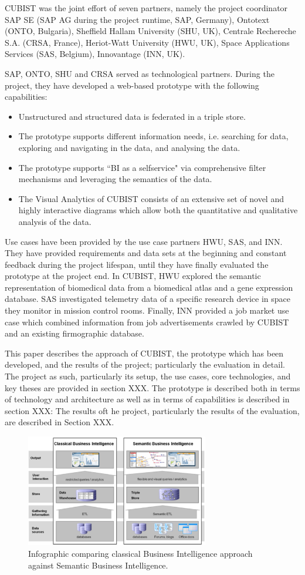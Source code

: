CUBIST was the joint effort of seven partners, namely the project coordinator SAP SE (SAP AG during the project runtime, SAP, Germany), Ontotext (ONTO, Bulgaria), Sheffield Hallam University (SHU, UK), Centrale Rechereche S.A. (CRSA, France), Heriot-Watt University (HWU, UK), Space Applications Services (SAS, Belgium), Innovantage (INN, UK). 

SAP, ONTO, SHU and CRSA served as technological partners. During the project, they have developed a web-based prototype with the following capabilities: 
\begin{itemize}
\item Unstructured and structured data is federated in a triple store.
\item The prototype supports different information needs, i.e. searching for data, exploring and navigating in the data, and analysing the data.
\item The prototype supports ``BI as a selfservice" via comprehensive filter mechanisms and leveraging the semantics of the data.
\item The Visual Analytics of CUBIST consists of an extensive set of novel and highly interactive diagrams which allow both the quantitative and qualitative analysis of the data.
\end{itemize}

Use cases have been provided by the use case partners HWU, SAS, and INN. They have provided requirements and data sets at the beginning and constant feedback during the project lifespan, until they have finally evaluated the prototype at the project end. In CUBIST, HWU explored the semantic representation of biomedical data from a biomedical atlas and a gene expression database. SAS investigated telemetry data of a specific research device in space they monitor in mission control rooms. Finally, INN provided a job market use case which combined information from job advertisements crawled by CUBIST and an existing firmographic database.

This paper describes the approach of CUBIST, the prototype which has been developed, and the results of the project; particularly the evaluation in detail. The project as such, particularly its setup, the use cases, core technologies, and key theses are provided in section XXX. The prototype is described both in terms of technology and architecture as well as in terms of capabilities is described in section XXX: The results oft he project, particularly the results of the evaluation, are described in Section XXX. 

\begin{figure}[htbp]
   \centering
   \includegraphics[width=8cm]{images/classicBI_vs_semanticBI} %
   \caption{Infographic comparing classical Business Intelligence approach against Semantic Business Intelligence.}
   \label{fig:classical_v_semantic}
\end{figure}